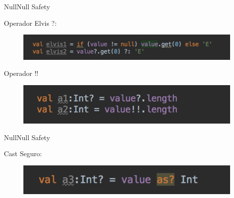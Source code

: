 \begin{frame}{Null}{Null Safety}
  \begin{block}{Operador Elvis ?:}
    \begin{figure}[h]
    \centering
    \includegraphics[width=\textwidth]{images/kotlin_vs_java/null_5}
    \end{figure}
  \end{block}
  \begin{block}{Operador !!}
    \begin{figure}[h]
    \centering
    \includegraphics[width=\textwidth]{images/kotlin_vs_java/null_6}
    \end{figure}
  \end{block}
\end{frame}

\begin{frame}{Null}{Null Safety}
  \begin{block}{Cast Seguro:}
    \begin{figure}[h]
    \centering
    \includegraphics[width=\textwidth]{images/kotlin_vs_java/null_7}
    \end{figure}
  \end{block}
\end{frame}

